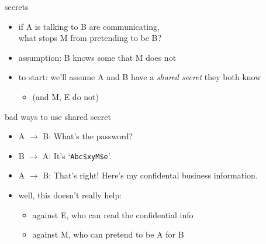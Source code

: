 \begin{frame}{secrets}
    \begin{itemize}
    \item if A is talking to B are communicating, \\
        what stops M from pretending to be B?
    \vspace{.5cm}
    \item assumption: B knows some  that M does not
    \vspace{.5cm}
    \item<2-> to start: we'll assume A and B have a \textit{shared secret} they both know
        \begin{itemize}
        \item (and M, E do not)
        \end{itemize}
    \end{itemize}
\end{frame}

\begin{frame}{bad ways to use shared secret}
    \begin{itemize}
    \item A $\rightarrow$ B: What's the password?
    \item B $\rightarrow$ A: It's `\texttt{Abc\$xyM\$e}'.
    \item A $\rightarrow$ B: That's right! Here's my confidental business information.
    \vspace{.5cm}
    \item<2-> well, this doesn't really help: 
        \begin{itemize}
        \item against E, who can read the confidential info
        \item against M, who can pretend to be A for B
        \end{itemize}
    \end{itemize}
\end{frame}
